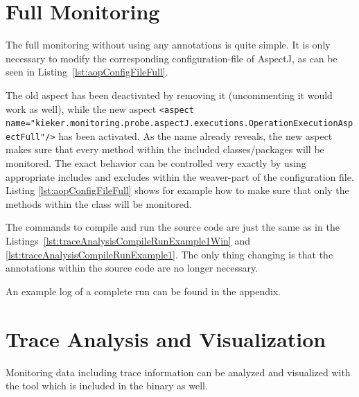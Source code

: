 \section{Full Monitoring}\label{sec:aspectJ:fullweaving}
The full monitoring without using any annotations is quite simple. It is only necessary to modify the corresponding configuration-file of AspectJ, as can be seen in Listing~\ref{lst:aopConfigFileFull}.

\setXMLListing


\noindent The old aspect has been deactivated by removing it (uncommenting it would work as well), while the new aspect \lstinline$<aspect name="kieker.monitoring.probe.aspectJ.executions.OperationExecutionAspectFull"/>$ has been activated. As the name already reveals, the new aspect makes sure that every method within the included classes/packages will be monitored. The exact behavior can be controlled very exactly by using appropriate includes and excludes within the weaver-part of the configuration file. Listing \ref{lst:aopConfigFileFull} shows for example how to make sure that only the methods within the class  will be monitored.

The commands to compile and run the source code are just the same as in the Listings~\ref{lst:traceAnalysisCompileRunExample1Win} and \ref{lst:traceAnalysisCompileRunExample1}. The only thing changing is that the annotations within the source code are no longer necessary.

An example log of a complete run can be found in the appendix.


\section{Trace Analysis and Visualization}\label{sec:traceAnalysisTool}

Monitoring data including trace information can be analyzed and visualized with %
the \KiekerTraceAnalysis{} tool which is included in the \Kieker{} binary as well.\\

 \vspace{3mm}

